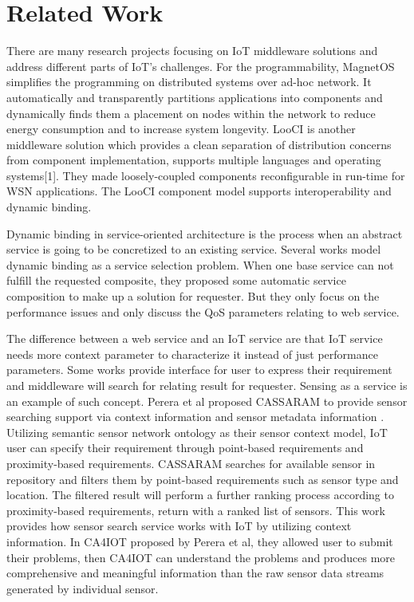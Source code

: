 \section{Related Work}
\label{c:related_work} 

There are many research projects focusing on IoT middleware solutions and address different parts of IoT’s challenges. For the programmability, MagnetOS simplifies the programming on distributed systems over ad-hoc network. It automatically and transparently partitions applications into components and dynamically finds them a placement on nodes within the network to reduce energy consumption and to increase system longevity. LooCI is another middleware solution which provides a clean separation of distribution concerns from component implementation, supports multiple languages and operating systems[1]. They made loosely-coupled components reconfigurable in run-time for WSN applications. The LooCI component model supports interoperability and dynamic binding. \cite{Bao1999}


Dynamic binding in service-oriented architecture is the process when an abstract service is going to be concretized to an existing service. Several works model dynamic binding as a service selection problem\cite{Liu2013,Yu2005,Huang2009}. When one base service can not fulfill the requested composite, they proposed some automatic service composition to make up a solution for requester. But they only focus on the performance issues and only discuss the QoS parameters relating to web service.


The difference between a web service and an IoT service are that IoT service needs more context parameter to characterize it instead of just performance parameters. Some works provide interface for user to express their requirement and middleware will search for relating result for requester. Sensing as a service is an example of such concept. Perera et al proposed CASSARAM to provide sensor searching support via context information and sensor metadata information\cite{Perera} . Utilizing semantic sensor network ontology as their sensor context model, IoT user can specify their requirement through point-based requirements and proximity-based requirements. CASSARAM searches for available sensor in repository and filters them by point-based requirements such as sensor type and location. The filtered result will perform a further ranking process according to proximity-based requirements, return with a ranked list of sensors. This work provides how sensor search service works with IoT by utilizing context information. In CA4IOT proposed by Perera et al\cite{Perera2013}, they allowed user to submit their problems, then CA4IOT can understand the problems and produces more comprehensive and meaningful information than the raw sensor data streams generated by individual sensor. 

